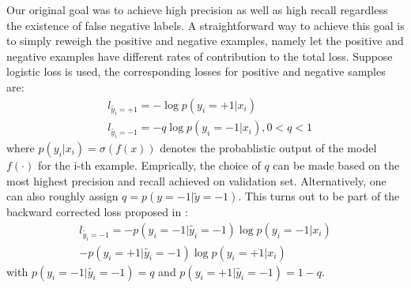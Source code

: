 \noindent
Our original goal was to achieve high precision as well as high recall regardless the existence of false negative labels.
A straightforward way to achieve this goal is to simply reweigh the positive and negative examples, namely let the positive and negative examples have different rates of contribution to the total loss.
Suppose logistic loss is used, the corresponding losses for positive and negative samples are:
\begin{equation*}
  \begin{aligned}
    & l_{\tilde{y_i}=+1} = - \log p(y_i=+1|x_i) \\
    & l_{\tilde{y_i}=-1} = - q \log p(y_i=-1 \vert x_i), 0<q<1
  \end{aligned}
\end{equation*}
where $p(y_i \vert x_i)=\sigma(f(x))$ denotes the probablistic output of the model $f(\cdot)$ for the i-th example. Emprically, the choice of $q$ can be made based on the most highest precision and recall achieved on validation set.
Alternatively, one can also roughly assign $q=p(y=-1 \vert \tilde{y}=-1)$.
This turns out to be part of the backward corrected loss proposed in \cite{patrini2016making}:
\begin{equation*}
  \begin{aligned}
    l_{\tilde{y_i}=-1} = - p(y_i=-1 \vert \tilde{y_i}=-1) \log p(y_i=-1 \vert x_i) \\ - p(y_i=+1 \vert \tilde{y_i}=-1) \log p(y_i=+1 \vert x_i)
  \end{aligned}
\end{equation*}
with $p(y_i=-1 \vert \tilde{y_i}=-1) = q$ and $p(y_i=+1 \vert \tilde{y_i}=-1) = 1-q$.


